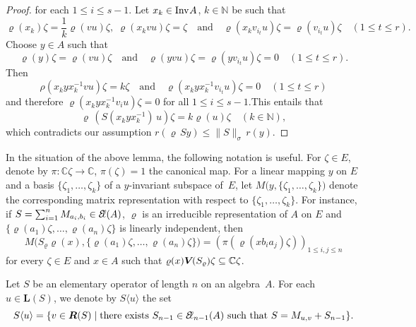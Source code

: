 \documentclass[a4paper,12pt,reqno]{amsart}
\numberwithin{equation}{section}
\theoremstyle{definition}
\begin{document}
\begin{proof}
for each $1 \leq i \leq s-1$. Let $x_k \in{{\textup{Inv}\kern.5pt A}}$, $k\in{\mathbb{N}}$ be such that
\begin{equation*}
\varrho(x_k)\zeta= \frac{1}{k}\varrho(vu)\zeta,\; \varrho(x_k vu )\zeta= \zeta \quad \text{and}\quad
           \varrho (x_k v_{i_t}u) \zeta=\varrho (v_{i_t} u ) \zeta \quad(1 \leq t \leq r).
\end{equation*}
Choose $y \in A$ such that
\begin{equation*}
\varrho (y) \zeta=\varrho (vu) \zeta \quad \text{and} \quad\varrho (y vu) \zeta= \varrho (y v_{i_t} u) \zeta= 0\quad(1 \leq t \leq r).
\end{equation*}
Then
\begin{equation*}
\rho (x_k^{} y x_k^{-1}vu) \zeta= k \zeta\quad\text{and}\quad\varrho(x_k^{} y x_k^{-1}v_{i_t}u) \zeta= 0\quad(1 \leq t \leq r)
\end{equation*}
and therefore $\varrho(x_k^{} y x_k^{-1}v_{i}u) \zeta =0$ for all $1 \leq i \leq s-1$.This entails that
\begin{equation*}
\varrho\,(S (x_k^{} y x_k^{-1})\, u) \zeta = k \varrho(u)\zeta\quad(k\in{\mathbb{N}}),
\end{equation*}
which contradicts our assumption $r(\varrho\,Sy)\leq{{\|{S}\|_\sigma}}\,r(y)$.
\end{proof}
In the situation of the above lemma, the following notation is useful.
For $\zeta\in E$, denote by $\pi\colon{\mathbb{C}}\zeta\to{\mathbb{C}}$, $\pi(\zeta)=1$ the canonical map.
For a linear mapping $y$ on $E$ and a basis $\{\zeta_1,\ldots,\zeta_k\}$ of a $y$-invariant subspace of~$E$,
let $M\bigl(y,\{\zeta_1,\ldots,\zeta_k\}\bigr)$ denote the corresponding matrix representation with respect to $\{\zeta_1,\ldots,\zeta_k\}$.
For instance, if $S=\sum_{i=1}^n  M_{a_i,b_i}\in{{\mathcal{E}\kern-2.6pt\ell(A)}}$, $\varrho$ is an irreducible representation of $A$ on $E$ and
$\{\varrho(a_1)\zeta, \ldots, \varrho(a_n)\zeta\}$ is linearly independent, then
\[
M\bigl(S_\varrho\varrho(x), \{\varrho(a_1)\zeta, \ldots, \varrho(a_n)\zeta\}\bigr)= (\pi(\varrho(x b_i a_j)\zeta))_{1 \leq i, j \leq n}
\]
for every $\zeta\in E$ and $x\in A$ such that $\varrho(x){{\bm V\mkern-2.5mu(S_\varrho)}}\zeta\subseteq{\mathbb{C}}\zeta$.

\smallskip
Let $S$ be an elementary operator of length $n$ on an algebra~$A$.
For each $u \in{{\bm L(S)}}$, we denote by $S\langle u \rangle$ the set
\begin{equation*}
S\langle u \rangle = \{v \in{{\bm R(S)}}\mid \text{there exists } S_{n-1}\in{{\mathcal{E}\kern-2.6pt\ell}}_{n-1} (A)\text{ such that }S= M_{u,v} + S_{n-1} \}.
\end{equation*}
\end{document}
